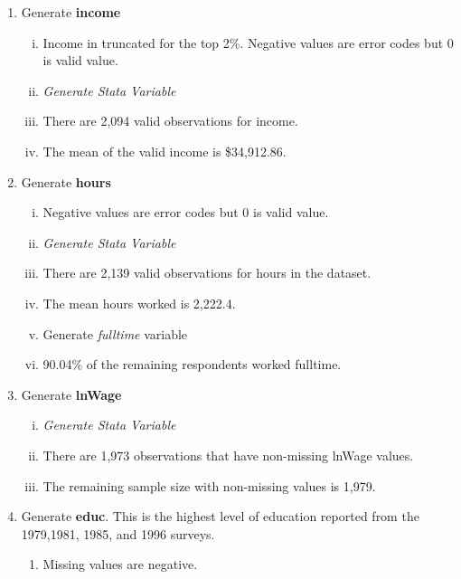 \documentclass[12pt]{article}
\begin{document}
\begin{enumerate}[\indent a.]
    \item Generate \textbf{income}
    \begin{enumerate}[(i)]
        \item Income in truncated for the top 2\%. Negative values are error 
        codes but 0 is valid value.

        \item \textit{Generate Stata Variable}
        
        \item There are 2,094 valid observations for income.
        
        \item  The mean of the valid income is \$34,912.86.
    \end{enumerate}

    \item Generate \textbf{hours}
    \begin{enumerate}[(i)]
        \item Negative values are error codes but 0 is valid value.
        
        \item \textit{Generate Stata Variable}
        
        \item There are 2,139 valid observations for hours in the dataset.
        
        \item The mean hours worked is 2,222.4.
        
        \item Generate \textit{fulltime} variable 

        \item 90.04\% of the remaining respondents worked fulltime.
    \end{enumerate} 

    \item Generate \textbf{lnWage}
    \begin{enumerate}[(i)]
        \item \textit{Generate Stata Variable}
        
        \item There are 1,973 observations that have non-missing lnWage values.
        
        \item The remaining sample size with non-missing values is 1,979.
    \end{enumerate}

    \item Generate \textbf{educ}.  This is the highest level of education 
    reported from the 1979,1981, 1985, and 1996 surveys.
    \begin{enumerate}
        \item Missing values are negative.
        

\end{enumerate}
\end{enumerate}
\end{document}
